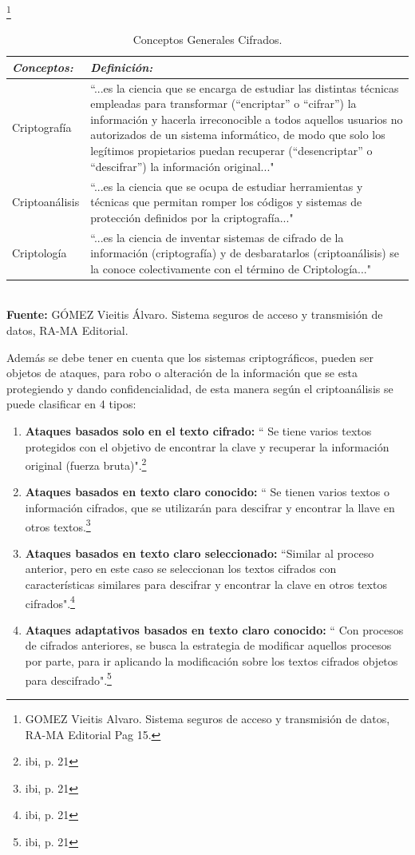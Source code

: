 \documentclass[a4paper,openright,12pt]{book}
\theoremstyle{definition}
\theoremstyle{remark}
\begin{document}
\begin{table}[ht]
\centering
\caption{Conceptos Generales Cifrados.}\footnote{GOMEZ Vieitis Alvaro. Sistema seguros de acceso y transmisión de datos, RA-MA Editorial Pag 15.}
\begin{tabular}{>{\centering\arraybackslash}m{3cm} >{\arraybackslash}m{9cm} }
\hline
\textbf{\textit{Conceptos:}} & \textbf{\textit{Definición:}} \\ \hline
Criptografía & “...es la ciencia que se encarga de estudiar las distintas técnicas empleadas para transformar (“encriptar” o “cifrar”) la información y hacerla irreconocible a todos aquellos usuarios no autorizados de un sistema informático, de modo que solo los legítimos propietarios puedan recuperar (“desencriptar” o “descifrar”) la información original..." \\ \hline
Criptoanálisis & “...es la ciencia que se ocupa de estudiar herramientas y técnicas que permitan romper los códigos y sistemas de protección definidos por la criptografía..." \\ \hline
Criptología & “...es la ciencia de inventar sistemas de cifrado de la información (criptografía) y de desbaratarlos (criptoanálisis) se la conoce colectivamente con el término de Criptología..." \\ \hline
\end{tabular}
\label{tabla:ConceptosCriptograficos}
\\\textbf{Fuente:} GÓMEZ Vieitis Álvaro. Sistema seguros de acceso y transmisión de datos, RA-MA Editorial.
\end{table}

Además se debe tener en cuenta que los sistemas criptográficos, pueden ser objetos de ataques, para robo o alteración de la información que se esta protegiendo y dando confidencialidad, de esta manera según el criptoanálisis se puede clasificar en 4 tipos:

\begin{enumerate}
	\item \textbf{Ataques basados solo en el texto cifrado:}  “ Se tiene varios textos protegidos con el objetivo de encontrar la clave y recuperar la información original (fuerza bruta)".\footnote{ibi, p. 21}
    \item \textbf{Ataques basados en texto claro conocido:} “ Se tienen varios textos o información cifrados, que se utilizarán para descifrar y encontrar la llave en otros textos.\footnote{ibi, p.  21}
    \item \textbf{Ataques basados en texto claro seleccionado:} “Similar al proceso anterior, pero en este caso se seleccionan los textos cifrados con características similares para descifrar y encontrar la clave en otros textos cifrados".\footnote{ibi, p. 21}
    \item \textbf{Ataques adaptativos basados en texto claro conocido: } “ Con procesos de cifrados anteriores, se busca la estrategia de modificar aquellos procesos por parte, para ir aplicando la modificación sobre los textos cifrados objetos para descifrado".\footnote{ibi, p. 21}
\end{enumerate}
\end{document}
